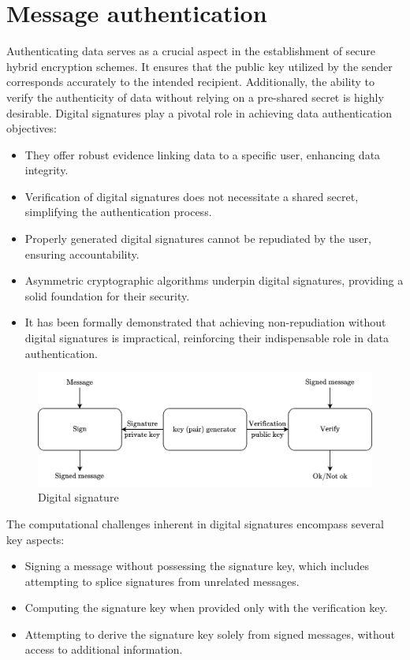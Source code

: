 \section{Message authentication}

Authenticating data serves as a crucial aspect in the establishment of secure hybrid encryption schemes. 
It ensures that the public key utilized by the sender corresponds accurately to the intended recipient. 
Additionally, the ability to verify the authenticity of data without relying on a pre-shared secret is highly desirable.
Digital signatures play a pivotal role in achieving data authentication objectives:
\begin{itemize}
    \item They offer robust evidence linking data to a specific user, enhancing data integrity.
    \item Verification of digital signatures does not necessitate a shared secret, simplifying the authentication process.
    \item Properly generated digital signatures cannot be repudiated by the user, ensuring accountability.
    \item Asymmetric cryptographic algorithms underpin digital signatures, providing a solid foundation for their security.
    \item It has been formally demonstrated that achieving non-repudiation without digital signatures is impractical, reinforcing their indispensable role in data authentication.
\end{itemize}
\begin{figure}[H]
    \centering
    \includegraphics[width=0.75\linewidth]{images/aut.png}
    \caption{Digital signature}
\end{figure}
The computational challenges inherent in digital signatures encompass several key aspects:
\begin{itemize}
    \item Signing a message without possessing the signature key, which includes attempting to splice signatures from unrelated messages.
    \item Computing the signature key when provided only with the verification key.
    \item Attempting to derive the signature key solely from signed messages, without access to additional information.
\end{itemize}

